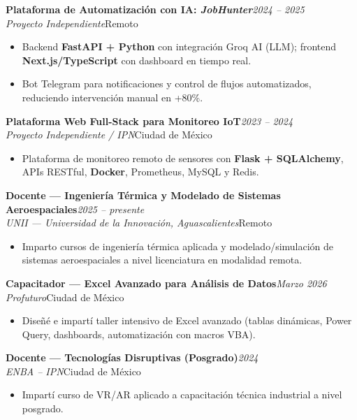 \documentclass[10pt, letterpaper]{article}
\newcommand{\cventry}[4]{%
  \vspace{2pt}%
  {\color{azuloscuro}\textbf{#1}}\hfill{\small\color{gristexto}\textit{#2}}\\[-3pt]
  {\small\color{azulmedio}\textit{#3}}\hfill{\small\color{gristexto}#4}%
  \vspace{1pt}%
}
\begin{document}
\vspace{2pt}

\cventry{Plataforma de Automatización con IA: \textit{JobHunter}}{2024 – 2025}{Proyecto Independiente}{Remoto}
\begin{itemize}
  \item Backend \textbf{FastAPI + Python} con integración Groq AI (LLM); frontend \textbf{Next.js/TypeScript} con dashboard en tiempo real.
  \item Bot Telegram para notificaciones y control de flujos automatizados, reduciendo intervención manual en +80\%.
\end{itemize}

\vspace{2pt}

\cventry{Plataforma Web Full-Stack para Monitoreo IoT}{2023 – 2024}{Proyecto Independiente / IPN}{Ciudad de México}
\begin{itemize}
  \item Plataforma de monitoreo remoto de sensores con \textbf{Flask + SQLAlchemy}, APIs RESTful, \textbf{Docker}, Prometheus, MySQL y Redis.
\end{itemize}

\vspace{2pt}

\cventry{Docente — Ingeniería Térmica y Modelado de Sistemas Aeroespaciales}{2025 – presente}{UNII — Universidad de la Innovación, Aguascalientes}{Remoto}
\begin{itemize}
  \item Imparto cursos de ingeniería térmica aplicada y modelado/simulación de sistemas aeroespaciales a nivel licenciatura en modalidad remota.
\end{itemize}

\vspace{2pt}

\cventry{Capacitador — Excel Avanzado para Análisis de Datos}{Marzo 2026}{Profuturo}{Ciudad de México}
\begin{itemize}
  \item Diseñé e impartí taller intensivo de Excel avanzado (tablas dinámicas, Power Query, dashboards, automatización con macros VBA).
\end{itemize}

\vspace{2pt}

\cventry{Docente — Tecnologías Disruptivas (Posgrado)}{2024}{ENBA – IPN}{Ciudad de México}
\begin{itemize}
  \item Impartí curso de VR/AR aplicado a capacitación técnica industrial a nivel posgrado.
\end{itemize}
\end{document}
